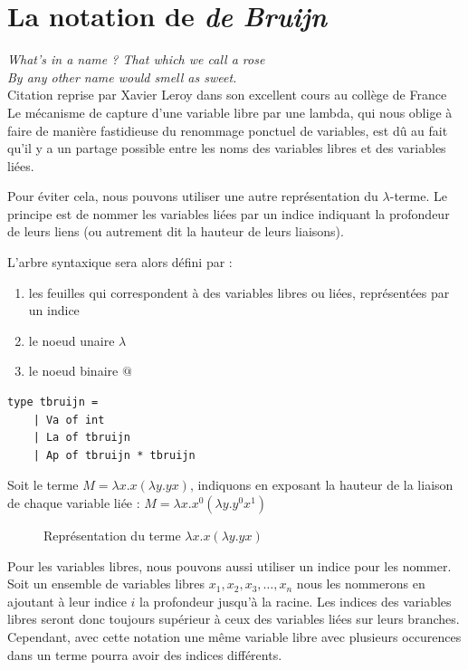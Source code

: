 \section{La notation de \textit{de Bruijn}}
\noindent
\textit{What's in a name ? That which we call a rose \\
	   By any other name would smell as sweet.}\cite{WS} \\
	   Citation reprise par Xavier Leroy dans
	   son excellent cours au collège de France \\

\vspace{0.4cm}
Le mécanisme de capture d'une variable libre par une lambda, qui nous oblige à faire de manière fastidieuse
du renommage ponctuel de variables, est dû au fait qu'il y a un partage possible entre les noms des variables
libres et des variables liées. 

Pour éviter cela, nous pouvons utiliser une autre représentation du $\lambda$-terme. Le principe est
de nommer les variables liées par un indice indiquant la profondeur de leurs liens (ou autrement dit la
hauteur de leurs liaisons).

L'arbre syntaxique sera alors défini par :
\begin{enumerate}
	\item les feuilles qui correspondent à des variables libres ou liées, représentées par un indice
	\item le noeud unaire $\lambda$
	\item le noeud binaire $@$
\end{enumerate}

\begin{Verbatim}
type tbruijn =
	| Va of int
	| La of tbruijn 
	| Ap of tbruijn * tbruijn
\end{Verbatim}
	
Soit le terme $M=\lambda x.x(\lambda y. yx)$, indiquons en exposant la hauteur de la liaison
de chaque variable liée : $M=\lambda x.x^0(\lambda y. y^0x^1)$
\begin{figure}[H]
\centering
\caption{Représentation du terme $\lambda x.x(\lambda y. yx)$}
\end{figure}

Pour les variables libres, nous pouvons aussi utiliser un indice pour les nommer.
Soit un ensemble de variables libres ${x_1, x_2, x_3,\dots, x_n}$ nous les nommerons en ajoutant 
à leur indice $i$ la profondeur jusqu'à la racine. Les indices des variables libres seront
 donc toujours supérieur à ceux des variables liées sur leurs branches. Cependant, avec cette notation une
 même variable libre avec plusieurs occurences dans un terme pourra avoir des indices différents.

